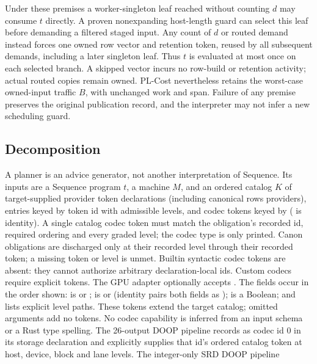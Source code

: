 Under these premises a worker-singleton leaf reached without counting \(d\)
may consume \(t\) directly. A proven nonexpanding host-length guard can select
this leaf before demanding a filtered staged input. Any count of \(d\) or routed
demand instead forces one owned row vector and retention token, reused by all
subsequent demands, including a later singleton leaf.
Thus \(t\) is evaluated at most once on each selected branch. A skipped vector
incurs no row-build or retention activity; actual routed copies remain owned.
PL-Cost nevertheless retains the worst-case owned-input traffic \(B\), with
unchanged work and span. Failure of any premise preserves the original
publication record, and the interpreter may not infer a new scheduling guard.

\subsection{Decomposition}
A planner is an advice generator, not another interpretation of Sequence.
Its inputs are a Sequence program $t$, a machine $M$, and an ordered catalog
$K$ of target-supplied provider token declarations (including  canonical rows providers),
entries keyed by token id with admissible levels, and codec tokens keyed by
 ( is identity).
A single catalog codec token must match the obligation's recorded id,
required ordering and every graded level; the codec type is only printed.
Canon obligations are discharged only at their recorded level through their
recorded token; a missing token or level is unmet.
Builtin syntactic  codec tokens are absent: they cannot authorize
arbitrary declaration-local ids. Custom codecs require explicit tokens.
The GPU  adapter optionally accepts
.
The fields occur in the order shown:  is  or
;  is  or  (identity pairs
both fields as );  is a Boolean; and 
lists explicit level paths. These tokens extend the target catalog; omitted
arguments add no tokens. No codec capability is inferred from an input schema
or a Rust type spelling.
The 26-output DOOP pipeline records  as codec id 0 in its
storage declaration and explicitly supplies that id's ordered catalog token
at host, device, block and lane levels. The integer-only SRD DOOP pipeline
